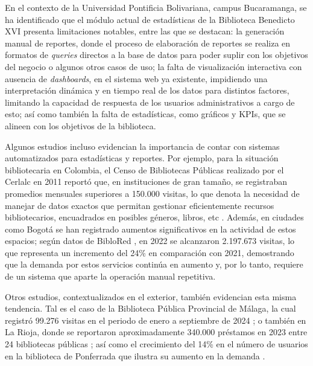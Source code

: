\documentclass[spanish]{ieee_upb}
\begin{document}
\vspace{0.3cm}
En el contexto de la Universidad Pontificia Bolivariana, campus Bucaramanga, se ha identificado que el módulo actual de estadísticas de la Biblioteca Benedicto XVI presenta limitaciones notables, entre las que se destacan: la generación manual de reportes, donde el proceso de elaboración de reportes se realiza en formatos de \textit{queries} directos a la base de datos para poder suplir con los objetivos del negocio o algunos otros casos de uso; la falta de visualización interactiva con ausencia de \textit{dashboards}, en el sistema web ya existente, impidiendo una interpretación dinámica y en tiempo real de los datos para distintos factores, limitando la capacidad de respuesta de los usuarios administrativos a cargo de esto; así como también la falta de estadísticas, como gráficos y KPIs, que se alineen con los objetivos de la biblioteca.

\vspace{0.3cm}
Algunos estudios incluso evidencian la importancia de contar con sistemas automatizados para estadísticas y reportes. Por ejemplo, para la situación bibliotecaria en Colombia, el Censo de Bibliotecas Públicas realizado por el Cerlalc en 2011 reportó que, en instituciones de gran tamaño, se registraban promedios mensuales superiores a 150.000 visitas, lo que denota la necesidad de manejar de datos exactos que permitan gestionar eficientemente recursos bibliotecarios, encuadrados en posibles géneros, libros, etc \cite{CERLALC2011}. Además, en ciudades como Bogotá se han registrado aumentos significativos en la actividad de estos espacios; según datos de BibloRed \cite{BIBLORED2022}, en 2022 se alcanzaron 2.197.673 visitas, lo que representa un incremento del 24\% en comparación con 2021, demostrando que la demanda por estos servicios continúa en aumento y, por lo tanto, requiere de un sistema que aparte la operación manual repetitiva.

\vspace{0.3cm}
Otros estudios, contextualizados en el exterior, también evidencian esta misma tendencia. Tal es el caso de la Biblioteca Pública Provincial de Málaga, la cual registró 99.276 visitas en el periodo de enero a septiembre de 2024 \cite{SER_malaga2024}; o también en La Rioja, donde se reportaron aproximadamente 340.000 préstamos en 2023 entre 24 bibliotecas públicas \cite{SER_rioja2024}; así como el crecimiento del 14\% en el número de usuarios en la biblioteca de Ponferrada que ilustra su aumento en la demanda \cite{SER_ponferrada2025}.
\end{document}
